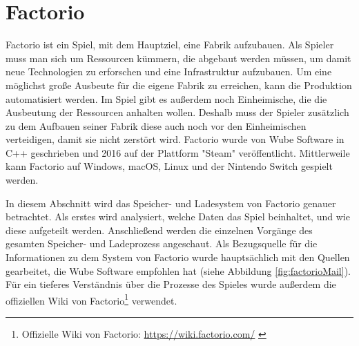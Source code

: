 \section{Factorio}
Factorio ist ein Spiel, mit dem Hauptziel, eine Fabrik aufzubauen. Als Spieler muss man sich um Ressourcen kümmern, die abgebaut werden müssen, um damit neue Technologien zu erforschen und eine Infrastruktur aufzubauen. Um eine möglichst große Ausbeute für die eigene Fabrik zu erreichen, kann die Produktion automatisiert werden. Im Spiel gibt es außerdem noch Einheimische, die die Ausbeutung der Ressourcen anhalten wollen. Deshalb muss der Spieler zusätzlich zu dem Aufbauen seiner Fabrik diese auch noch vor den Einheimischen verteidigen, damit sie nicht zerstört wird. Factorio wurde von Wube Software in C++ geschrieben und 2016 auf der Plattform "Steam" veröffentlicht. Mittlerweile kann Factorio auf Windows, macOS, Linux und der Nintendo Switch gespielt werden.\cite{factorioMain}\cite{factorioPressFactorio}

In diesem Abschnitt wird das Speicher- und Ladesystem von Factorio genauer betrachtet. Als erstes wird analysiert, welche Daten das Spiel beinhaltet, und wie diese aufgeteilt werden. Anschließend werden die einzelnen Vorgänge des gesamten Speicher- und Ladeprozess angeschaut. Als Bezugsquelle für die Informationen zu dem System von Factorio wurde hauptsächlich mit den Quellen gearbeitet, die Wube Software empfohlen hat (siehe Abbildung \ref{fig:factorioMail}). Für ein tieferes Verständnis über die Prozesse des Spieles wurde außerdem die offiziellen Wiki von Factorio\footnote{Offizielle Wiki von Factorio: \url{https://wiki.factorio.com/} \cite{factorioPressFactorio}} verwendet.

